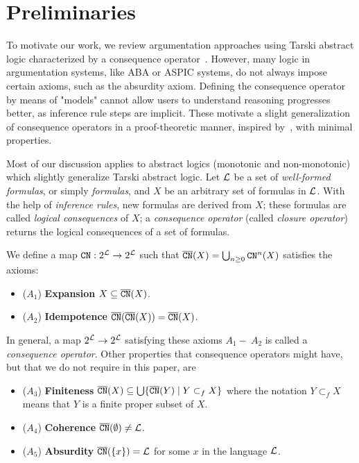 \section{Preliminaries}
\label{sec:preliminary}

To motivate our work, we review argumentation approaches using Tarski abstract logic characterized by a consequence operator~\cite{Amgoud2009}. 
However, many logic in argumentation systems, like ABA or ASPIC systems, do not always impose certain axioms, such as the absurdity axiom.
Defining the consequence operator by means of "models" cannot allow users to understand reasoning progresses better, as inference rule steps are implicit. 
These motivate a slight generalization of consequence operators in a proof-theoretic manner, inspired by~\cite{Stephen1975}, with minimal properties.


Most of our discussion applies to abstract logics (monotonic and non-monotonic) which slightly generalize Tarski abstract logic.
Let $\mathcal{L}$ be a set of \emph{well-formed formulas}, or simply \textit{formulas}, and $X$ be an arbitrary set of formulas in $\mathcal{L}$. With the help of \emph{inference rules}, new formulas are derived from $X$; these formulas are called \emph{logical consequences} of $X$; a \emph{consequence operator} (called \textit{closure operator}) returns the logical consequences of a set of formulas. 
    
\begin{definition}
     We define a map $\texttt{\textup{CN}} : 2^{\mathcal{L}} \to 2^{\mathcal{L}}$ such that $\overline{\texttt{\textup{CN}}}(X) = \bigcup_{n \geq 0}\texttt{\textup{CN}}^{n}(X)$ satisfies the axioms: %
%
     \begin{itemize}
        \item ($A_1$) \textbf{Expansion} $X \subseteq \overline{\texttt{\textup{CN}}}(X)$.
        \item ($A_2$) \textbf{Idempotence} $\overline{\texttt{\textup{CN}}}(\overline{\texttt{\textup{CN}}}(X)) = \overline{\texttt{\textup{CN}}}(X)$.
         
        
    \end{itemize}
\end{definition}
In general, a map $2^{\mathcal{L}} \to 2^{\mathcal{L}}$ satisfying these axioms $A_1 -\ A_2$ is called a \emph{consequence operator}. Other properties that consequence operators might have, but that we do not require in this paper, are
\begin{itemize}   
    \item ($A_3$) \textbf{Finiteness} $\overline{\texttt{\textup{CN}}}(X) \subseteq \bigcup \{ \overline{\texttt{\textup{CN}}}(Y) \mid Y \subset_{f} X \}$ where the notation $Y \subset_{f} X$ means that $Y$ is a finite proper subset of $X$.
    \item ($A_4$) \textbf{Coherence} $\overline{\texttt{\textup{CN}}}(\emptyset) \neq \mathcal{L}$.
    \item ($A_5$) \textbf{Absurdity} $\overline{\texttt{\textup{CN}}}(\{x\}) = \mathcal{L}$ for some $x$ in the language $\mathcal{L}$.
\end{itemize}

